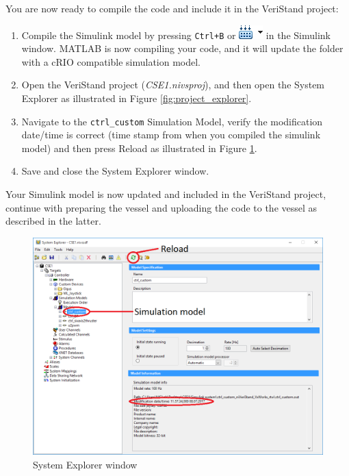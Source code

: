 You are now ready to compile the code and include it in the VeriStand project:
\begin{enumerate}
	\item Compile the Simulink model by pressing \texttt{Ctrl+B} or \includegraphics{fig/build.png} in the Simulink window. MATLAB is now compiling your code, and it will update the folder  with a cRIO compatible simulation model. 
	\item Open the VeriStand project (\textit{CSE1.nivsproj}), and then open the System Explorer as illustrated in Figure \ref{fig:project_explorer}.
	\item Navigate to the \texttt{ctrl\_custom} Simulation Model, verify the modification date/time is correct (time stamp from when you compiled the simulink model) and then press Reload as illustrated in Figure \ref{fig:system_explorer}. 
	\item Save and close the System Explorer window. 
\end{enumerate}
Your Simulink model is now updated and included in the VeriStand project, continue with preparing the vessel and uploading the code to the vessel as described in the latter. 
\begin{figure}[htb!]
	\centering
	\includegraphics[scale=0.5]{fig/system_explorer.png}
	\caption{System Explorer window}
	\label{fig:system_explorer}
\end{figure}
